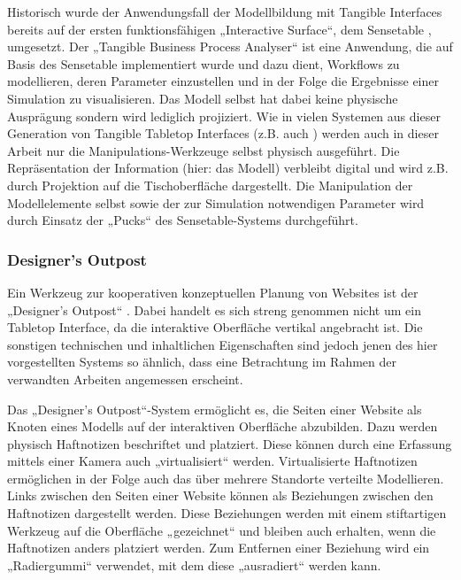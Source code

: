 Historisch wurde der Anwendungsfall der Modellbildung mit Tangible Interfaces bereits auf der ersten funktionsfähigen „Interactive Surface“, dem Sensetable \citep{Patten01}, umgesetzt. Der „Tangible Business Process Analyser“ \citep{Mori04} ist eine Anwendung, die auf Basis des Sensetable implementiert wurde und dazu dient, Workflows zu modellieren, deren Parameter einzustellen und in der Folge die Ergebnisse einer Simulation zu visualisieren. Das Modell selbst hat dabei keine physische Ausprägung sondern wird lediglich projiziert. Wie in vielen Systemen aus dieser Generation von Tangible Tabletop Interfaces (z.B. auch \citep{Fitzmaurice95}) werden auch in dieser Arbeit nur die Manipulations-Werkzeuge selbst physisch ausgeführt. Die Repräsentation der Information (hier: das Modell) verbleibt digital und wird z.B. durch Projektion auf die Tischoberfläche dargestellt. Die Manipulation der Modellelemente selbst sowie der zur Simulation notwendigen Parameter wird durch Einsatz der „Pucks“ des Sensetable-Systems durchgeführt.

\subsubsection{Designer's Outpost} %
\label{ssub:designer_s_outpost}

Ein Werkzeug zur kooperativen konzeptuellen Planung von Websites ist der „Designer's Outpost“ \citep{Klemmer01}. Dabei handelt es sich streng genommen nicht um ein Tabletop Interface, da die interaktive Oberfläche vertikal angebracht ist. Die sonstigen technischen und inhaltlichen Eigenschaften sind jedoch jenen des hier vorgestellten Systems so ähnlich, dass eine Betrachtung im Rahmen der verwandten Arbeiten angemessen erscheint. 

Das „Designer's Outpost“-System ermöglicht es, die Seiten einer Website als Knoten eines Modells auf der interaktiven Oberfläche abzubilden. Dazu werden physisch Haftnotizen beschriftet und platziert. Diese können durch eine Erfassung mittels einer Kamera auch „virtualisiert“ werden. Virtualisierte Haftnotizen ermöglichen in der Folge auch das über mehrere Standorte verteilte Modellieren. Links zwischen den Seiten einer Website können als Beziehungen zwischen den Haftnotizen dargestellt werden. Diese Beziehungen werden mit einem stiftartigen Werkzeug auf die Oberfläche „gezeichnet“ und bleiben auch erhalten, wenn die Haftnotizen anders platziert werden. Zum Entfernen einer Beziehung wird ein „Radiergummi“ verwendet, mit dem diese „ausradiert“ werden kann.

